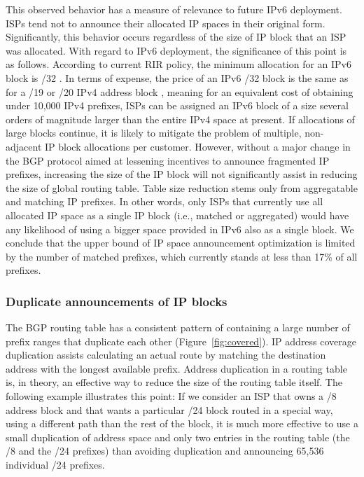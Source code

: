 This observed behavior has a measure of relevance to future IPv6 deployment.
ISPs tend not to announce their allocated IP spaces in their original form.
Significantly, this behavior occurs regardless of the size of IP block that an
ISP was allocated. With regard to IPv6 deployment, the significance of this
point is as follows. According to current RIR policy, the minimum allocation
for an IPv6 block is /32 \cite{APNIC:2009:IPv6-Address}. In terms of expense,
the price of an IPv6 /32 block is the same as for a /19 or /20 IPv4 address
block \cite{ARIN:2009:Annual-Fee-Scedule}, meaning for an equivalent cost of
obtaining under 10,000 IPv4 prefixes, ISPs can be assigned an IPv6 block of a
size several orders of magnitude larger than the entire IPv4 space at present.
If allocations of large blocks continue, it is likely to mitigate the problem
of multiple, non-adjacent IP block allocations per customer. However, without a
major change in the BGP protocol aimed at lessening incentives to announce
fragmented IP prefixes, increasing the size of the IP block will not
significantly assist in reducing the size of global routing table. Table size
reduction stems only from aggregatable and matching IP prefixes. In other
words, only ISPs that currently use all allocated IP space as a single IP block
(i.e., matched or aggregated) would have any likelihood of using a bigger space
provided in IPv6 also as a single block. We conclude that the upper bound of IP
space announcement optimization is limited by the number of matched prefixes,
which currently stands at less than 17\% of all prefixes.

\subsubsection{Duplicate announcements of IP blocks}

The BGP routing table has a consistent pattern of containing a large number of
prefix ranges that duplicate each other (Figure~\ref{fig:covered}). IP address
coverage duplication assists calculating an actual route by matching the
destination address with the longest available prefix.  Address duplication in
a routing table is, in theory, an effective way to reduce the size of the
routing table itself. The following example illustrates this point: If we
consider an ISP that owns a /8 address block and that wants a particular /24
block routed in a special way, using a different path than the rest of the
block, it is much more effective to use a small duplication of address space
and only two entries in the routing table (the /8 and the /24 prefixes) than
avoiding duplication and announcing 65,536 individual /24 prefixes.

